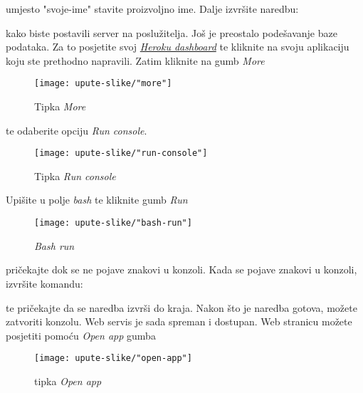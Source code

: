 			 
			 \noindent
			 umjesto "svoje-ime" stavite proizvoljno ime. Dalje izvršite naredbu:
			 
			 
			 \noindent
			 kako biste postavili server na poslužitelja. Još je preostalo podešavanje baze podataka. Za to posjetite svoj \href{https://dashboard.heroku.com/apps}{\textit{Heroku dashboard}} te kliknite na svoju aplikaciju koju ste prethodno napravili. Zatim kliknite na gumb \textit{More} 
			 
			 \begin{figure}[H]
			 	\texttt{[image: upute-slike/"more"]}
			 	\centering
			 	\caption{Tipka \textit{More}}
			 	\label{mala_labelica}
			 \end{figure}
			 
			 te odaberite opciju \textit{Run console}. 
			 
			 \begin{figure}[H]
			 	\texttt{[image: upute-slike/"run-console"]}
			 	\centering
			 	\caption{Tipka \textit{Run console}}
			 	\label{mala_labelica}
			 \end{figure}
			 
			 Upišite u polje \textit{bash} te kliknite gumb \textit{Run} 
			 
			 \begin{figure}[H]
			 	\texttt{[image: upute-slike/"bash-run"]}
			 	\centering
			 	\caption{\textit{Bash run}}
			 	\label{mala_labelica}
			 \end{figure}
			 
			 pričekajte dok se ne pojave znakovi
			 \code{\textasciitilde  \$} u konzoli. Kada se pojave znakovi \code{\textasciitilde  \$} u konzoli, izvršite komandu:
			 
			 
			 \noindent
			 te pričekajte da se naredba izvrši do kraja. Nakon što je naredba gotova, možete zatvoriti konzolu. Web servis je sada spreman i dostupan. Web stranicu možete posjetiti pomoću \textit{Open app} gumba
			 
			 \begin{figure}[H]
			 	\texttt{[image: upute-slike/"open-app"]}
			 	\centering
			 	\caption{tipka \textit{Open app}}
			 	\label{mala_labelica}
			 \end{figure}
			 
			 
			 
			
			
			\eject 